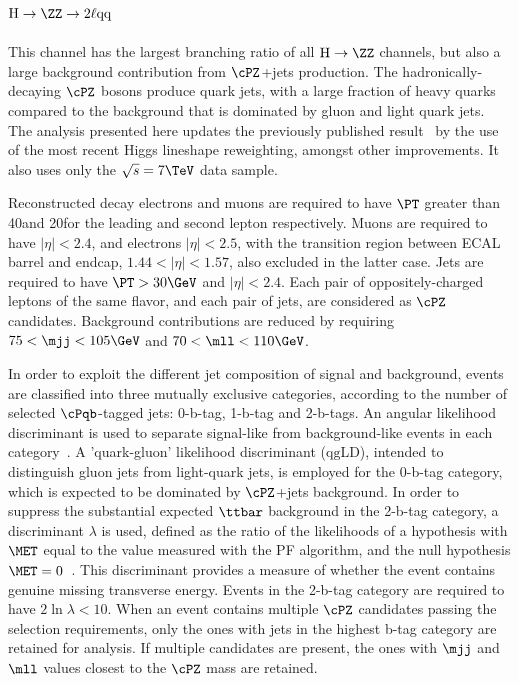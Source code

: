 \subsection{$\mathrm{H} \to \ZZ \to 2\ell \mathrm{qq}$}

This channel has the largest branching ratio of all $\mathrm{H} \to \ZZ$ channels, but also a large background
contribution from $\cPZ$+jets production. The hadronically-decaying $\cPZ$ bosons produce quark jets, with a large
fraction of heavy quarks compared to the background that is dominated by gluon and light quark jets. The analysis
presented here updates the previously published result~\cite{2l2qpaper} by the use of the most recent
Higgs lineshape reweighting, amongst other improvements. It also uses only the $\sqrt{s}=7\TeV$ data sample.

Reconstructed decay electrons and muons are required to have $\PT$ greater than 40\GeV and 20\GeV for the leading
and second lepton respectively. Muons are required to have $|\eta|<2.4$, and electrons $|\eta|<2.5$, with the transition
region between ECAL barrel and endcap, $1.44<|\eta|<1.57$, also excluded in the latter case. Jets are required to have
$\PT>30\GeV$ and $|\eta| < 2.4$. Each pair of oppositely-charged leptons of the same flavor, and each pair of jets,
are considered as $\cPZ$ candidates. Background contributions are reduced by requiring $75<\mjj<105\GeV$ and $70<\mll<110\GeV$.

In order to exploit the different jet composition of signal and background, events are classified into three
mutually exclusive categories, according to the number of selected $\cPqb$-tagged jets: 0-b-tag, 1-b-tag and 2-b-tags.
An angular likelihood discriminant is used to separate signal-like from background-like events in each category~\cite{Gao:2010qx}. A 'quark-gluon' likelihood discriminant ($\mathrm{qg}$LD), intended to distinguish gluon
jets from light-quark jets, is employed for the 0-b-tag category, which is expected to be dominated by $\cPZ$+jets
background. In order to suppress the substantial expected $\ttbar$ background in the 2-b-tag category, a discriminant
$\lambda$ is used, defined as the ratio of the likelihoods of a hypothesis with $\MET$ equal to the value measured with
the PF algorithm, and the null hypothesis $\MET=0$~\cite{Chatrchyan:2011tn}. This discriminant provides a measure of
whether the event contains genuine missing transverse energy. Events in the 2-b-tag category are required to
have $2\ln{\lambda} < 10$. When an event contains multiple $\cPZ$ candidates passing the selection requirements,
only the ones with jets in the highest b-tag category are retained for analysis. If multiple candidates are
present, the ones with $\mjj$ and $\mll$ values closest to the $\cPZ$ mass are retained.

